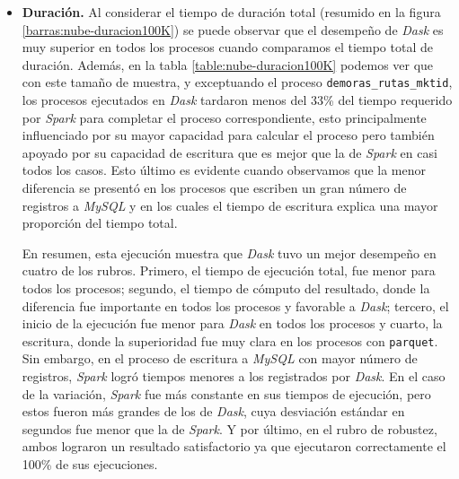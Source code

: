 \begin{itemize}
	\item \textbf{Duración.} Al considerar el tiempo de duración total (resumido en la figura \ref{barras:nube-duracion100K}) se puede observar que el desempeño de \textit{Dask} es muy superior en todos los procesos cuando comparamos el tiempo total de duración. Además, en la tabla \ref{table:nube-duracion100K} podemos ver que con este tamaño de muestra, y exceptuando el proceso \texttt{demoras\_rutas\_mktid}, los procesos ejecutados en \textit{Dask} tardaron menos del 33\% del tiempo requerido por \textit{Spark} para completar el proceso correspondiente, esto principalmente influenciado por su mayor capacidad para calcular el proceso pero también apoyado por su capacidad de escritura que es mejor que la de \textit{Spark} en casi todos los casos. Esto último es evidente cuando observamos que la menor diferencia se presentó en los procesos que escriben un gran número de registros a \textit{MySQL} y en los cuales el tiempo de escritura explica una mayor proporción del tiempo total.
	
En resumen, esta ejecución muestra que \textit{Dask} tuvo un mejor desempeño en cuatro de los rubros. Primero, el tiempo de ejecución total, fue menor para todos los procesos; segundo, el tiempo de cómputo del resultado, donde la diferencia fue importante en todos los procesos y favorable a \textit{Dask}; tercero, el inicio de la ejecución fue menor para \textit{Dask} en todos los procesos y cuarto, la escritura, donde la superioridad fue muy clara en los procesos con \texttt{parquet}. Sin embargo, en el proceso de escritura a \textit{MySQL} con mayor número de registros, \textit{Spark} logró tiempos menores a los registrados por \textit{Dask}. En el caso de la variación, \textit{Spark} fue más constante en sus tiempos de ejecución, pero estos fueron más grandes de los de \textit{Dask}, cuya desviación estándar en segundos fue menor que la de \textit{Spark}. Y por último, en el rubro de robustez, ambos lograron un resultado satisfactorio ya que ejecutaron correctamente el 100\% de sus ejecuciones.
	
\end{itemize}


